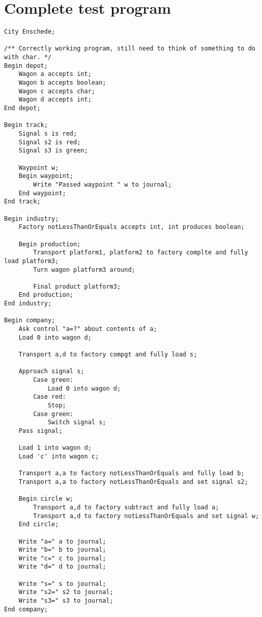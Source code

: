 \chapter{Complete test program}
\label{chap:testprogram}

\begin{landscape}
\begin{lstlisting}
City Enschede;

/** Correctly working program, still need to think of something to do with char. */
Begin depot;
    Wagon a accepts int;
    Wagon b accepts boolean;
    Wagon c accepts char;
    Wagon d accepts int;
End depot;

Begin track;
    Signal s is red;
    Signal s2 is red;
    Signal s3 is green;

    Waypoint w;
    Begin waypoint;
        Write "Passed waypoint " w to journal;
    End waypoint;
End track;

Begin industry;
    Factory notLessThanOrEquals accepts int, int produces boolean;

    Begin production;
        Transport platform1, platform2 to factory complte and fully load platform3;
        Turn wagon platform3 around;

        Final product platform3;
    End production;
End industry;

Begin company;
    Ask control "a=?" about contents of a;
    Load 0 into wagon d;

    Transport a,d to factory compgt and fully load s;

    Approach signal s;
        Case green:
            Load 0 into wagon d;
        Case red:
            Stop;
        Case green:
            Switch signal s;
    Pass signal;

    Load 1 into wagon d;
    Load 'c' into wagon c;

    Transport a,a to factory notLessThanOrEquals and fully load b;
    Transport a,a to factory notLessThanOrEquals and set signal s2;

    Begin circle w;
        Transport a,d to factory subtract and fully load a;
        Transport a,d to factory notLessThanOrEquals and set signal w;
    End circle;

    Write "a=" a to journal;
    Write "b=" b to journal;
    Write "c=" c to journal;
    Write "d=" d to journal;

    Write "s=" s to journal;
    Write "s2=" s2 to journal;
    Write "s3=" s3 to journal;
End company;
\end{lstlisting}
\end{landscape}
